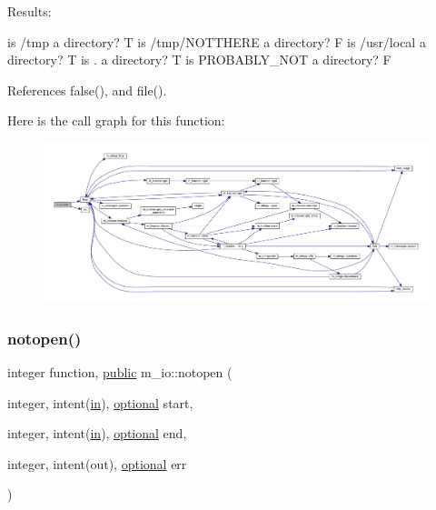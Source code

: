 Results\+:

is /tmp a directory? T is /tmp/\+N\+O\+T\+T\+H\+E\+RE a directory? F is /usr/local a directory? T is . a directory? T is P\+R\+O\+B\+A\+B\+L\+Y\+\_\+\+N\+OT a directory? F 

References false(), and file().

Here is the call graph for this function\+:
\nopagebreak
\begin{figure}[H]
\begin{center}
\leavevmode
\includegraphics[width=350pt]{namespacem__io_a6793f5adc45177098781af4be39911ff_cgraph}
\end{center}
\end{figure}
\mbox{\label{namespacem__io_a673f7f7e137424eed9c6a736901a5cbc}} 
\subsubsection{\texorpdfstring{notopen()}{notopen()}}
{\footnotesize\ttfamily integer function, \hyperlink{M__stopwatch_83_8txt_a2f74811300c361e53b430611a7d1769f}{public} m\+\_\+io\+::notopen (\begin{DoxyParamCaption}\item[{integer, intent(\hyperlink{M__journal_83_8txt_afce72651d1eed785a2132bee863b2f38}{in}), \hyperlink{option__stopwatch_83_8txt_aa4ece75e7acf58a4843f70fe18c3ade5}{optional}}]{start,  }\item[{integer, intent(\hyperlink{M__journal_83_8txt_afce72651d1eed785a2132bee863b2f38}{in}), \hyperlink{option__stopwatch_83_8txt_aa4ece75e7acf58a4843f70fe18c3ade5}{optional}}]{end,  }\item[{integer, intent(out), \hyperlink{option__stopwatch_83_8txt_aa4ece75e7acf58a4843f70fe18c3ade5}{optional}}]{err }\end{DoxyParamCaption})}



